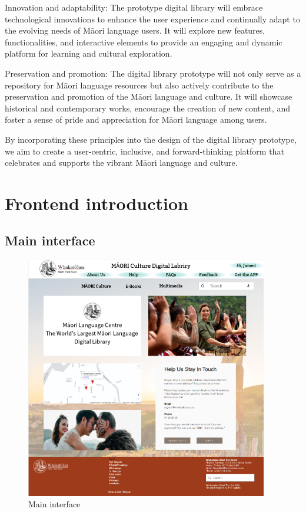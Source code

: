 Innovation and adaptability: The prototype digital library will embrace technological innovations to enhance the user experience and continually adapt to the evolving needs of Māori language users. It will explore new features, functionalities, and interactive elements to provide an engaging and dynamic platform for learning and cultural exploration.

Preservation and promotion: The digital library prototype will not only serve as a repository for Māori language resources but also actively contribute to the preservation and promotion of the Māori language and culture. It will showcase historical and contemporary works, encourage the creation of new content, and foster a sense of pride and appreciation for Māori language among users.

By incorporating these principles into the design of the digital library prototype, we aim to create a user-centric, inclusive, and forward-thinking platform that celebrates and supports the vibrant Māori language and culture.

\section{Frontend introduction}

\subsection{Main interface}

\begin{figure}[htbp]
  \centerline{\includegraphics[width=300pt]{images/3-1-1.png}}
  \caption{Main interface}
  \label{fig3.1.1}
\end{figure}

